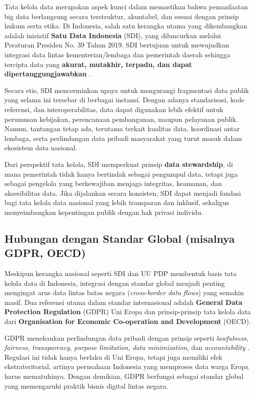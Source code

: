 Tata kelola data merupakan aspek kunci dalam memastikan bahwa pemanfaatan big data berlangsung secara terstruktur, akuntabel, dan sesuai dengan prinsip hukum serta etika. Di Indonesia, salah satu kerangka utama yang dikembangkan adalah inisiatif \textbf{Satu Data Indonesia} (SDI), yang diluncurkan melalui Peraturan Presiden No. 39 Tahun 2019. SDI bertujuan untuk mewujudkan integrasi data lintas kementerian/lembaga dan pemerintah daerah sehingga tercipta data yang \textbf{akurat, mutakhir, terpadu, dan dapat dipertanggungjawabkan} \cite{perpres2019sdi}.  

Secara etis, SDI mencerminkan upaya untuk mengurangi fragmentasi data publik yang selama ini tersebar di berbagai instansi. Dengan adanya standarisasi, kode referensi, dan interoperabilitas, data dapat digunakan lebih efektif untuk perumusan kebijakan, perencanaan pembangunan, maupun pelayanan publik. Namun, tantangan tetap ada, terutama terkait kualitas data, koordinasi antar lembaga, serta perlindungan data pribadi masyarakat yang turut masuk dalam ekosistem data nasional.  

Dari perspektif tata kelola, SDI memperkuat prinsip \textbf{data stewardship}, di mana pemerintah tidak hanya bertindak sebagai pengumpul data, tetapi juga sebagai pengelola yang berkewajiban menjaga integritas, keamanan, dan aksesibilitas data. Jika dijalankan secara konsisten, SDI dapat menjadi fondasi bagi tata kelola data nasional yang lebih transparan dan inklusif, sekaligus menyeimbangkan kepentingan publik dengan hak privasi individu.

\subsection{Hubungan dengan Standar Global (misalnya GDPR, OECD)}

Meskipun kerangka nasional seperti SDI dan UU PDP membentuk basis tata kelola data di Indonesia, integrasi dengan standar global menjadi penting mengingat arus data lintas batas negara (\textit{cross-border data flows}) yang semakin masif. Dua referensi utama dalam standar internasional adalah \textbf{General Data Protection Regulation} (GDPR) Uni Eropa dan prinsip-prinsip tata kelola data dari \textbf{Organisation for Economic Co-operation and Development} (OECD).  

GDPR menekankan perlindungan data pribadi dengan prinsip seperti \textit{lawfulness, fairness, transparency}, \textit{purpose limitation}, \textit{data minimization}, dan \textit{accountability} \cite{voigt2017gdpr}. Regulasi ini tidak hanya berlaku di Uni Eropa, tetapi juga memiliki efek ekstrateritorial, artinya perusahaan Indonesia yang memproses data warga Eropa harus mematuhinya. Dengan demikian, GDPR berfungsi sebagai standar global yang memengaruhi praktik bisnis digital lintas negara.  

